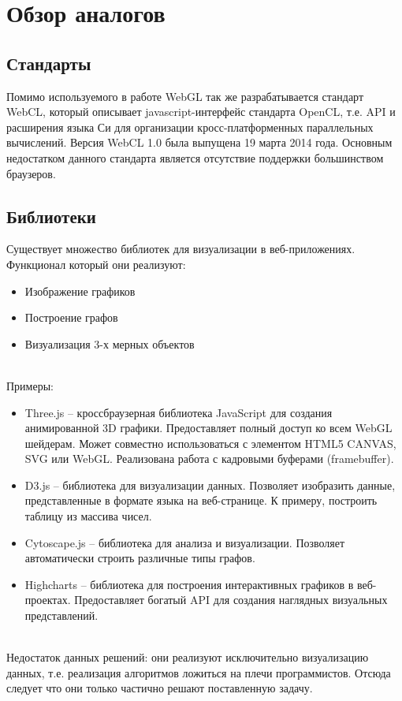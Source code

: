 \newpage
\section{Обзор аналогов}

\subsection{Стандарты}

Помимо используемого в работе WebGL так же разрабатывается стандарт WebCL, который описывает 
javascript-интерфейс стандарта OpenCL, т.е. API и расширения языка Си для организации
кросс-платформенных параллельных вычислений. Версия WebCL 1.0 была выпущена 19 марта 2014 года.
Основным недостатком данного стандарта является отсутствие поддержки большинством браузеров.

\subsection{Библиотеки}
Существует множество библиотек для визуализации в веб-приложениях. Функционал который они реализуют:
\begin{itemize}
  \item Изображение графиков
  \item Построение графов
  \item Визуализация 3-х мерных объектов
\end{itemize}
\\
Примеры:
\begin{itemize}
  \item Three.js -- кроссбраузерная библиотека JavaScript для создания анимированной 3D графики.
    Предоставляет полный доступ ко всем WebGL шейдерам. Может совместно использоваться с элементом
    HTML5 CANVAS, SVG или WebGL. Реализована работа с кадровыми буферами (framebuffer).
  \item D3.js -- библиотека для визуализации данных. Позволяет изобразить данные, представленные в
    формате языка на веб-странице. К примеру, построить таблицу из массива чисел.
  \item Cytoscape.js -- библиотека для анализа и визуализации. Позволяет автоматически 
    строить различные типы графов.
  \item Highcharts -- библиотека для построения интерактивных графиков в веб-проектах. Предоставляет
    богатый API для создания наглядных визуальных представлений.
\end{itemize}
\\
Недостаток данных решений: они реализуют исключительно визуализацию данных, т.е. реализация
алгоритмов ложиться на плечи программистов. Отсюда следует что они только частично решают поставленную
задачу.
